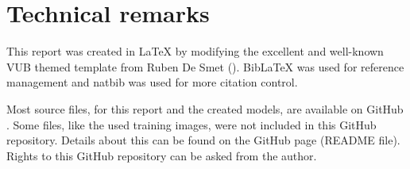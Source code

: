 \section{Technical remarks}
\label{section:technical_remarks}

This report was created in \LaTeX{} by modifying the excellent and well-known VUB themed template from Ruben De Smet (\citeyear{latex_template}). BibLaTeX was used for reference management and natbib was used for more citation control. 

Most source files, for this report and the created models, are available on GitHub \citep{github_project}. Some files, like the used training images, were not included in this GitHub repository. Details about this can be found on the GitHub page (README file). Rights to this GitHub repository can be asked from the author.